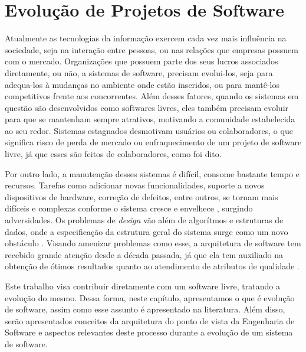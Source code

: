 \chapter{Evolução de Projetos de Software}

Atualmente as tecnologias da informação exercem cada vez mais influência na sociedade, seja na interação entre pessoas, ou nas relações que empresas possuem com o mercado. Organizações que possuem parte dos seus lucros associados diretamente, ou não, a sistemas de software, precisam evolui-los, seja para adequa-los à mudanças no ambiente onde estão inseridos, ou para mantê-los competitivos frente aos concorrentes. Além desses fatores, quando os sistemas em questão são desenvolvidos como softwares livres, eles também precisam evoluir para que se mantenham sempre atrativos, motivando a comunidade estabelecida ao seu redor. Sistemas estagnados desmotivam usuários ou colaboradores, o que significa risco de perda de mercado ou enfraquecimento de um projeto de software livre, já que esses são feitos de colaboradores, como foi dito.

Por outro lado, a manutenção desses sistemas é difícil, consome bastante tempo e recursos. Tarefas como adicionar novas funcionalidades, suporte a novos dispositivos de hardware, correção de defeitos, entre outros, se tornam mais difíceis e complexas conforme o sistema cresce e envelhece \cite{godfrey2000evolution}, surgindo adversidades. Os problemas de \textit{design} vão além de algorítmos e estruturas de dados, onde a especificação da estrutura geral do sistema surge como um novo obstáculo \cite{garlan1993introduction}. Visando amenizar problemas como esse, a arquitetura de software tem recebido grande atenção  desde a década passada, já que ela tem auxiliado na obtenção de ótimos resultados quanto ao atendimento de atributos de qualidade \cite{fabricio2009instrumentation}.

Este trabalho visa contribuir diretamente com um software livre, tratando a evolução do mesmo. Dessa forma, neste capítulo, apresentamos o que é evolução de software, assim como esse assunto é apresentado na literatura. Além disso, serão apresentados conceitos da arquitetura do ponto de vista da Engenharia de Software e aspectos relevantes deste processo durante a evolução de um sistema de software. %

